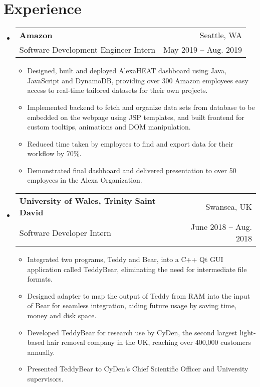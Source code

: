 \documentclass[letterpaper,11pt]{article}
\makeatletter
\newcommand{\resumeSubheading}[4]{
  \vspace{-1pt}\item
    \begin{tabular*}{0.98\textwidth}[t]{l@{\extracolsep{\fill}}r}
      \textbf{#1} & #2 \\
      {\small#3} & {\small #4} \\
    \end{tabular*}\vspace{-5pt}
}
\newcommand{\resumeSubHeadingListStart}{\begin{itemize}[leftmargin=*]}
\newcommand{\resumeSubHeadingListEnd}{\end{itemize}}
\newcommand{\resumeItemListStart}{\begin{itemize}[leftmargin=*]}
\newcommand{\resumeItemListEnd}{\end{itemize}\vspace{-5pt}}
\makeatother
\begin{document}
\section{Experience}
\resumeSubHeadingListStart
    \resumeSubheading
      {Amazon}{Seattle, WA}
      {Software Development Engineer Intern}{May 2019 -- Aug. 2019}
      \resumeItemListStart
        \item {Designed, built and deployed AlexaHEAT dashboard using Java, JavaScript and DynamoDB, providing over 300 Amazon employees easy access to real-time tailored datasets for their own projects.}
	\item {Implemented backend to fetch and organize data sets from database to be embedded on the webpage using JSP templates, and built frontend for custom tooltips, animations and DOM manipulation.}
        \item {Reduced time taken by employees to find and export data for their workflow by 70\%.}
        \item {Demonstrated final dashboard and delivered presentation to over 50 employees in the Alexa Organization.}
      \resumeItemListEnd

    \resumeSubheading
      {University of Wales, Trinity Saint David}{Swansea, UK}
      {Software Developer Intern}{June 2018 -- Aug. 2018}
      \resumeItemListStart
        \item
          {Integrated two programs, Teddy and Bear, into a C++ Qt GUI application called TeddyBear, eliminating the need for intermediate file formats.}
        \item
          {Designed adapter to map the output of Teddy from RAM into the input of Bear for seamless integration, aiding future usage by saving time, money and disk space.}
        \item
          {Developed TeddyBear for research use by CyDen, the second largest light-based hair removal company in the UK, reaching over 400,000 customers annually.}
        \item
          {Presented TeddyBear to CyDen's Chief Scientific Officer and University supervisors.}
      \resumeItemListEnd

\resumeSubHeadingListEnd

\end{document}
